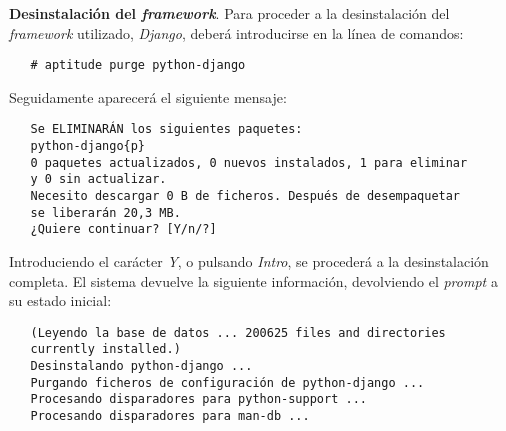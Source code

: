 \item \textbf{Desinstalación del \textit{framework}}.
   Para proceder a la desinstalación del \textit{framework} utilizado,
   \textit{Django}, deberá introducirse en la línea de comandos:

   \begin{verbatim}
   # aptitude purge python-django
   \end{verbatim}

   Seguidamente aparecerá el siguiente mensaje:

   \begin{verbatim}
   Se ELIMINARÁN los siguientes paquetes:
   python-django{p}
   0 paquetes actualizados, 0 nuevos instalados, 1 para eliminar
   y 0 sin actualizar.
   Necesito descargar 0 B de ficheros. Después de desempaquetar
   se liberarán 20,3 MB.
   ¿Quiere continuar? [Y/n/?]
   \end{verbatim}

   Introduciendo el carácter \textit{Y}, o pulsando \textit{Intro}, se procederá
   a la desinstalación completa. El sistema devuelve la siguiente información,
   devolviendo el \textit{prompt} a su estado inicial:

   \begin{verbatim}
   (Leyendo la base de datos ... 200625 files and directories
   currently installed.)
   Desinstalando python-django ...
   Purgando ficheros de configuración de python-django ...
   Procesando disparadores para python-support ...
   Procesando disparadores para man-db ...
   \end{verbatim}
